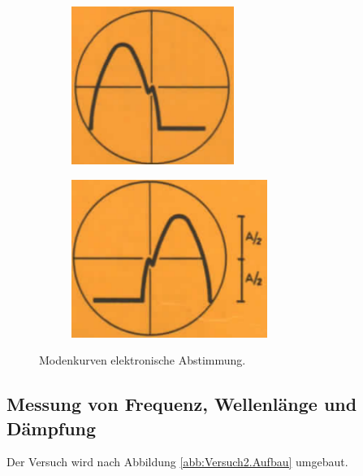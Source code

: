 \begin{figure}
  \centering
  \begin{subfigure}{0.3\textwidth}
    \raggedleft
    \includegraphics[width=0.58\textwidth]{Versuch1.4.png}
    \caption{}
    \label{abb:Versuch1.4}
  \end{subfigure}
  \begin{subfigure}{0.3\textwidth}
    \raggedright
    \includegraphics[width=0.7\textwidth]{Versuch1.5.png}
    \caption{}
    \label{abb:Versuch1.5}
  \end{subfigure}
  \caption{Modenkurven elektronische Abstimmung.\cite{Q1}}
\end{figure}

\subsection{Messung von Frequenz, Wellenlänge und Dämpfung}

Der Versuch wird nach Abbildung \ref{abb:Versuch2.Aufbau} umgebaut.

